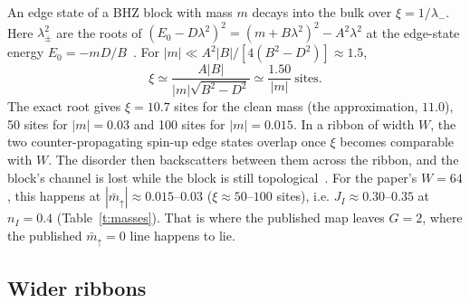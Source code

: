 \documentclass[11pt,a4paper]{article}
\newcommand{\up}{{\uparrow}}
\begin{document}
An edge state of a BHZ block with mass $m$ decays into the bulk over $\xi=1/\lambda_-$. Here
$\lambda_\pm^2$ are the roots of $(E_0-D\lambda^2)^2=(m+B\lambda^2)^2-A^2\lambda^2$ at the edge-state energy
$E_0=-mD/B$~\cite{zhou2008}. For $|m|\ll A^2|B|/[4(B^2-D^2)]\approx1.5$,
\begin{equation}
\xi \simeq \frac{A|B|}{|m|\sqrt{B^2-D^2}} \simeq \frac{1.50}{|m|}\ \text{sites}.
\end{equation}
The exact root gives $\xi=10.7$ sites for the clean mass (the approximation, $11.0$), 50 sites
for $|m|=0.03$ and 100 sites for $|m|=0.015$. In a ribbon of width $W$, the two counter-propagating spin-up edge states overlap
once $\xi$ becomes comparable with $W$. The disorder then backscatters between them across the
ribbon, and the block's channel is lost while the block is still topological~\cite{zhou2008}. For
the paper's $W=64$, this happens at $|\bar m_\up|\approx0.015$--$0.03$ ($\xi\approx50$--$100$
sites), i.e. $J_I\approx0.30$--$0.35$ at $n_I=0.4$ (Table~\ref{t:masses}). That is where the published map leaves $G=2$, where the
published $\bar m_\up=0$ line happens to lie.

\subsection{Wider ribbons}
\end{document}
